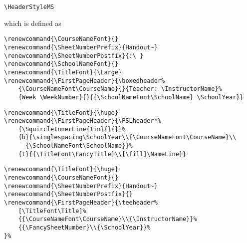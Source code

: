 \documentclass[12pt,twoside,parskip,notitle]{handout}
\begin{document}
\newpage

\begingroup
\HeaderStyleMS
\maketitle
\verb|\HeaderStyleMS|

which is defined as

\singlespacing
\begin{verbatim}
\renewcommand{\CourseNameFont}{}
\renewcommand{\SheetNumberPrefix}{Handout~}
\renewcommand{\SheetNumberPostfix}{:\ }
\renewcommand{\SchoolNameFont}{}
\renewcommand{\TitleFont}{\Large}
\renewcommand{\FirstPageHeader}{\boxedheader%
    {\CourseNameFont\CourseName}{}{Teacher: \InstructorName}%
    {Week \WeekNumber}{}{{\SchoolNameFont\SchoolName} \SchoolYear}}
\end{verbatim}
\endgroup

\newpage

\begingroup
\renewcommand{\Title}{A very very very long title indeed!}
\renewcommand{\TitleFont}{\huge}
\renewcommand{\FirstPageHeader}{\PSLheader*%
	{\SquircleInnerLine{1in}{}{}}%
	{b}{\singlespacing\SchoolYear\\{\CourseNameFont\CourseName}\\{\SchoolNameFont\SchoolName}}%
	{t}{{\TitleFont\FancyTitle}\\[\fill]\NameLine}}
\maketitle
\singlespacing
\begin{verbatim}
\renewcommand{\TitleFont}{\huge}
\renewcommand{\FirstPageHeader}{\PSLheader*%
    {\SquircleInnerLine{1in}{}{}}%
    {b}{\singlespacing\SchoolYear\\{\CourseNameFont\CourseName}\\
      {\SchoolNameFont\SchoolName}}%
    {t}{{\TitleFont\FancyTitle}\\[\fill]\NameLine}}
\end{verbatim}
\endgroup

\newpage

\begingroup
\renewcommand{\TitleFont}{\huge}
\renewcommand{\CourseNameFont}{}
\renewcommand{\SheetNumberPrefix}{Handout~}
\renewcommand{\SheetNumberPostfix}{}
\renewcommand{\FirstPageHeader}{\teeheader%
	[\TitleFont\Title]%
	{{\CourseNameFont\CourseName}\\{\InstructorName}}%
	{{\FancySheetNumber}\\{\SchoolYear}}%
}%
\maketitle
\singlespacing
\begin{verbatim}
\renewcommand{\TitleFont}{\huge}
\renewcommand{\CourseNameFont}{}
\renewcommand{\SheetNumberPrefix}{Handout~}
\renewcommand{\SheetNumberPostfix}{}
\renewcommand{\FirstPageHeader}{\teeheader%
    [\TitleFont\Title]%
    {{\CourseNameFont\CourseName}\\{\InstructorName}}%
    {{\FancySheetNumber}\\{\SchoolYear}}%
}%
\end{verbatim}
\endgroup
\end{document}
